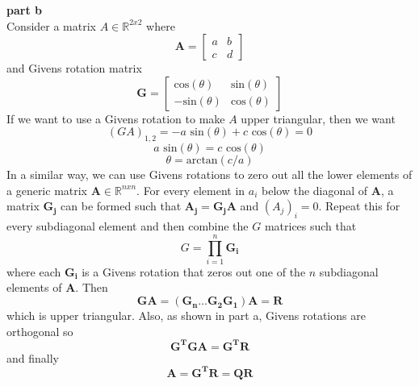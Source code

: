 \documentclass{article} %
\begin{document}
\textbf{part b} \\
Consider a matrix $A \in \mathbb{R}^{2x2}$ where 
\begin{equation*}
\boldsymbol{A} = \begin{bmatrix} a & b \\ c & d \end{bmatrix}
\end{equation*}
and Givens rotation matrix 
\begin{equation*}
\boldsymbol{G} = \begin{bmatrix} \mbox{cos}(\theta) & \mbox{sin}(\theta) \\ -\mbox{sin}(\theta) & \mbox{cos}(\theta) \end{bmatrix}
\end{equation*}
If we want to use a Givens rotation to make $A$ upper triangular, then we want
\begin{equation*}
(GA)_{1,2} = -a \mbox{ sin}(\theta) + c \mbox{ cos}(\theta) = 0
\end{equation*}
\begin{equation*}
a \mbox{ sin}(\theta) = c \mbox{ cos}(\theta)
\end{equation*}
\begin{equation*}
\theta = \mbox{arctan}(c/a)
\end{equation*}
In a similar way, we can use Givens rotations to zero out all the lower elements of a generic matrix $\boldsymbol{A} \in \mathbb{R}^{nxn}$.  For every element in $a_{i}$ below the diagonal of $\boldsymbol{A}$, a matrix $\boldsymbol{G_j}$ can be formed such that $\boldsymbol{A_j} = \boldsymbol{G_j A}$ and $(A_j)_i = 0$.  Repeat this for every subdiagonal element and then combine the $G$ matrices such that
\begin{equation*}
G = \prod_{i=1}^n \boldsymbol{G_i}
\end{equation*}
where each $\boldsymbol{G_i}$ is a Givens rotation that zeros out one of the $n$ subdiagonal elements of $\boldsymbol{A}$.  Then
\begin{equation*}
\boldsymbol{GA} = (\boldsymbol{G_n} \ldots \boldsymbol{G_2 G_1}) \boldsymbol{A} = \boldsymbol{R}
\end{equation*}
which is upper triangular.  Also, as shown in part a, Givens rotations are orthogonal so 
\begin{equation*}
\boldsymbol{G^T GA} = \boldsymbol{G^T R}
\end{equation*}
and finally
\begin{equation*}
\boldsymbol{A} = \boldsymbol{G^T R} = \boldsymbol{QR}
\end{equation*}
\end{document}
